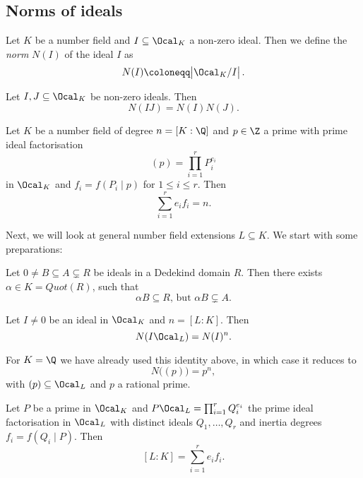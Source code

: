 
\subsection*{Norms of ideals}

\begin{defn*}
	Let \( K \) be a number field and \( I \subseteq \Ocal_K \) a non-zero ideal.
	Then we define the \emph{norm} \( N(I) \) of the ideal \( I \) as
	\[ N(I) \coloneqq \big| \Ocal_K / I \big| \,. \]
\end{defn*}

\begin{lem}
	Let \( I, J \subseteq \Ocal_K \) be non-zero ideals.
	Then
	\[ N(IJ) = N(I) N(J). \]
\end{lem}

\begin{prop}
	Let \( K \) be a number field of degree \( n = [K:\Q] \) and \( p \in \Z \) a prime with prime ideal factorisation
	\[ (p) = \prod_{i=1}^r P_i^{e_i} \]
	in \( \Ocal_K \) and \( f_i = f(P_i \mid p) \) for \( 1 \leq i \leq r \).
	Then
	\[ \sum_{i=1}^r e_i f_i = n. \]
\end{prop}

Next, we will look at general number field extensions \( L \subseteq K \).
We start with some preparations:

\begin{lem}
	Let \( 0 \neq B \subseteq A \subsetneq R \) be ideals in a Dedekind domain \( R \).
	Then there exists \( \alpha \in K = Quot(R) \), such that
	\[ \alpha B \subseteq R, \, \text{but } \alpha B \subsetneq A. \]
\end{lem}

\begin{lem}
	Let \( I \neq 0 \) be an ideal in \( \Ocal_K \) and \( n = [L:K] \).
	Then
	\[ N(I \Ocal_L) = N(I)^n. \]
\end{lem}

\begin{exmp*}
	For \( K = \Q \) we have already used this identity above, in which case it reduces to
	\[ N\big( (p) \big) = p^n, \]
	with \( (p) \subseteq \Ocal_L \) and \( p \) a rational prime.
\end{exmp*}

\begin{thmn}\label{thm:2.17}
	Let \( P \) be a prime in \( \Ocal_K \) and \( P \Ocal_L = \prod_{i=1}^r Q_i^{e_i} \) the prime ideal factorisation in \( \Ocal_L \) with distinct ideals \( Q_1, \dotsc, Q_r \) and inertia degrees \( f_i = f(Q_i \mid P) \).
	Then
	\[ [L:K] = \sum_{i=1}^r e_i f_i. \]
\end{thmn}

